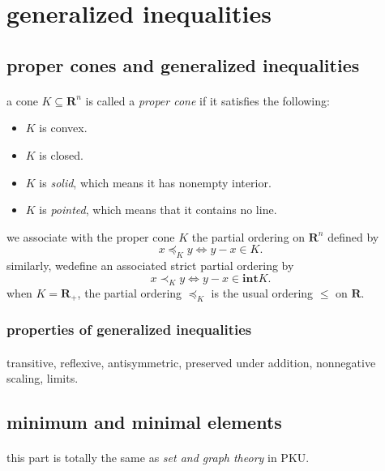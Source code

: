 \documentclass{article}
\begin{document}
\section{generalized inequalities}
  \subsection{proper cones and generalized inequalities}
    \paragraph{} a cone $K \subseteq \mathbf{R}^n$ is called a \textit{proper cone} if it satisfies the following:
    \begin{itemize}
      \item $K$ is convex.
      \item $K$ is closed.
      \item $K$ is \textit{solid}, which means it has nonempty interior.
      \item $K$ is \textit{pointed}, which means that it contains no line.
    \end{itemize}
    we associate with the proper cone $K$ the partial ordering on $\mathbf{R}^n$ defined by
    \begin{equation}
      x \preceq_K y \iff y - x \in K.
    \end{equation}
    similarly, wedefine an associated strict partial ordering by
    \begin{equation}
      x \prec_K y \iff y - x \in \mathbf{int} K.
    \end{equation}
    when $K = \mathbf{R}_+$, the partial ordering $\preceq_K$ is the usual ordering $\leq$ on $\mathbf{R}$.
    \subsubsection{properties of generalized inequalities}
      \paragraph{} transitive, reflexive, antisymmetric, preserved under addition, nonnegative scaling, limits.
  \subsection{minimum and minimal elements}
    \paragraph{} this part is totally the same as \textit{set and graph theory} in PKU.
\end{document}
